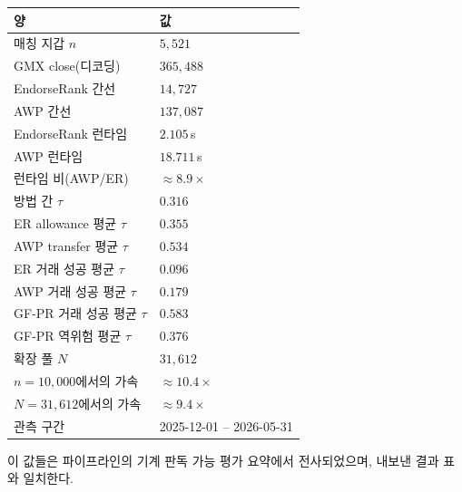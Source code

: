 \begin{center}
\begin{tabular}{ll}
\toprule
양 & 값 \\
\midrule
매칭 지갑 $n$ & $5{,}521$ \\
GMX close(디코딩) & $365{,}488$ \\
EndorseRank 간선 & $14{,}727$ \\
AWP 간선 & $137{,}087$ \\
EndorseRank 런타임 & $2.105$\,s \\
AWP 런타임 & $18.711$\,s \\
런타임 비(AWP/ER) & $\approx 8.9\times$ \\
방법 간 $\tau$ & $0.316$ \\
ER allowance 평균 $\tau$ & $0.355$ \\
AWP transfer 평균 $\tau$ & $0.534$ \\
ER 거래 성공 평균 $\tau$ & $0.096$ \\
AWP 거래 성공 평균 $\tau$ & $0.179$ \\
GF-PR 거래 성공 평균 $\tau$ & $0.583$ \\
GF-PR 역위험 평균 $\tau$ & $0.376$ \\
확장 풀 $N$ & $31{,}612$ \\
$n=10{,}000$에서의 가속 & $\approx 10.4\times$ \\
$N=31{,}612$에서의 가속 & $\approx 9.4\times$ \\
관측 구간 & 2025-12-01 -- 2026-05-31 \\
\bottomrule
\end{tabular}
\end{center}

이 값들은 파이프라인의 기계 판독 가능 평가 요약에서 전사되었으며, 내보낸 결과 표와 일치한다.
